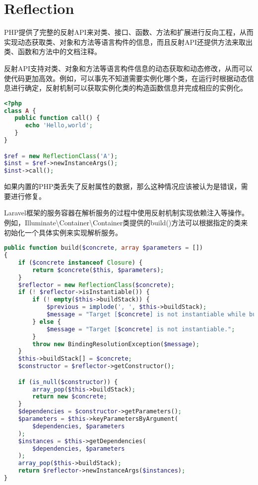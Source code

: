 \chapter{Reflection}

PHP提供了完整的反射API来对类、接口、函数、方法和扩展进行反向工程，从而实现动态获取类、对象和方法等语言构件的信息，而且反射API还提供方法来取出类、函数和方法中的文档注释。

反射API支持对类、对象和方法等语言构件信息的动态获取和动态修改，从而可以使代码更加高效。例如，可以事先不知道需要实例化哪个类，在运行时根据动态信息进行确定，反射机制可以获取实例化类的构造函数信息并完成相应的实例化。

\begin{lstlisting}[language=PHP]
<?php
class A {
   public function call() {
      echo 'Hello,world';
   }
}

$ref = new ReflectionClass('A');
$inst = $ref->newInstanceArgs();
$inst->call();
\end{lstlisting}

如果内置的PHP类丢失了反射属性的数据，那么这种情况应该被认为是错误，需要进行修复。

Laravel框架的服务容器在解析服务的过程中使用反射机制实现依赖注入等操作。例如，Illuminate\textbackslash Container\textbackslash Container类提供的build()方法可以根据指定的类来初始化一个具体实例来实现解析服务。

\begin{lstlisting}[language=PHP]
public function build($concrete, array $parameters = [])
{
    if ($concrete instanceof Closure) {
        return $concrete($this, $parameters);
    }
    $reflector = new ReflectionClass($concrete);
    if (! $reflector->isInstantiable()) {
        if (! empty($this->buildStack)) {
            $previous = implode(', ', $this->buildStack);
            $message = "Target [$concrete] is not instantiable while building [$previous].";
        } else {
            $message = "Target [$concrete] is not instantiable.";
        }
        throw new BindingResolutionException($message);
    }
    $this->buildStack[] = $concrete;
    $constructor = $reflector->getConstructor();

    if (is_null($constructor)) {
        array_pop($this->buildStack);
        return new $concrete;
    }
    $dependencies = $constructor->getParameters();
    $parameters = $this->keyParametersByArgument(
        $dependencies, $parameters
    );
    $instances = $this->getDependencies(
        $dependencies, $parameters
    );
    array_pop($this->buildStack);
    return $reflector->newInstanceArgs($instances);
}
\end{lstlisting}

